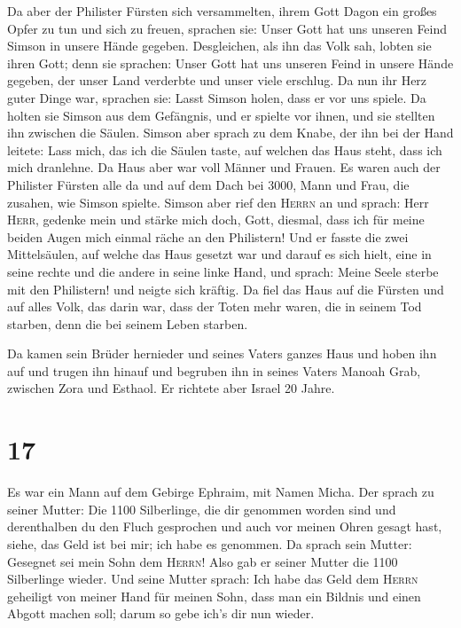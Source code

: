  Da aber der Philister Fürsten sich versammelten, ihrem
Gott Dagon ein großes Opfer zu tun und sich zu freuen, sprachen sie:
Unser Gott hat uns unseren Feind Simson in unsere Hände gegeben.
 Desgleichen, als ihn das Volk sah, lobten sie ihren
Gott; denn sie sprachen: Unser Gott hat uns unseren Feind in unsere
Hände gegeben, der unser Land verderbte und unser viele erschlug.
 Da nun ihr Herz guter Dinge war, sprachen sie: Lasst
Simson holen, dass er vor uns spiele. Da holten sie Simson aus dem
Gefängnis, und er spielte vor ihnen, und sie stellten ihn zwischen die
Säulen.  Simson aber sprach zu dem Knabe, der ihn bei der
Hand leitete: Lass mich, das ich die Säulen taste, auf welchen das Haus
steht, dass ich mich dranlehne.  Da Haus aber war voll
Männer und Frauen. Es waren auch der Philister Fürsten alle da und auf
dem Dach bei 3000, Mann und Frau, die zusahen, wie Simson spielte.
 Simson aber rief den \textsc{Herrn} an und sprach: Herr
\textsc{Herr}, gedenke mein und stärke mich doch, Gott, diesmal, dass
ich für meine beiden Augen mich einmal räche an den Philistern!
 Und er fasste die zwei Mittelsäulen, auf welche das Haus
gesetzt war und darauf es sich hielt, eine in seine rechte und die
andere in seine linke Hand,  und sprach: Meine Seele
sterbe mit den Philistern! und neigte sich kräftig. Da fiel das Haus auf
die Fürsten und auf alles Volk, das darin war, dass der Toten mehr
waren, die in seinem Tod starben, denn die bei seinem Leben starben.

 Da kamen sein Brüder hernieder und seines Vaters ganzes
Haus und hoben ihn auf und trugen ihn hinauf und begruben ihn in seines
Vaters Manoah Grab, zwischen Zora und Esthaol. Er richtete aber Israel
20 Jahre.

\hypertarget{section-16}{%
\section{17}\label{section-16}}

 Es war ein Mann auf dem Gebirge Ephraim, mit Namen Micha.
 Der sprach zu seiner Mutter: Die 1100 Silberlinge, die
dir genommen worden sind und derenthalben du den Fluch gesprochen und
auch vor meinen Ohren gesagt hast, siehe, das Geld ist bei mir; ich habe
es genommen. Da sprach sein Mutter: Gesegnet sei mein Sohn dem
\textsc{Herrn}!  Also gab er seiner Mutter die 1100
Silberlinge wieder. Und seine Mutter sprach: Ich habe das Geld dem
\textsc{Herrn} geheiligt von meiner Hand für meinen Sohn, dass man ein
Bildnis und einen Abgott machen soll; darum so gebe ich's dir nun
wieder.

